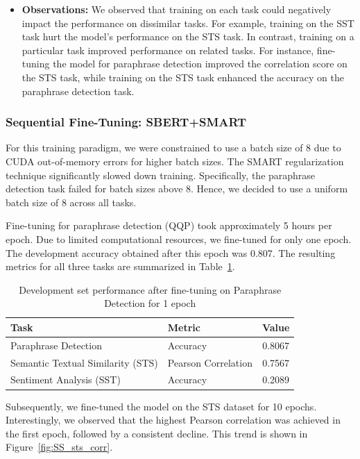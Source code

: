 \begin{itemize}
    \item \textbf{Observations:}
    We observed that training on each task could negatively impact the performance on dissimilar tasks. For example, training on the SST task hurt the model's performance on the STS task. In contrast, training on a particular task improved performance on related tasks. For instance, fine-tuning the model for paraphrase detection improved the correlation score on the STS task, while training on the STS task enhanced the accuracy on the paraphrase detection task.
\end{itemize}

\subsubsection{Sequential Fine-Tuning: SBERT+SMART}
For this training paradigm, we were constrained to use a batch size of 8 due to CUDA out-of-memory errors for higher batch sizes. The SMART regularization technique significantly slowed down training. Specifically, the paraphrase detection task failed for batch sizes above 8. Hence, we decided to use a uniform batch size of 8 across all tasks.

Fine-tuning for paraphrase detection (QQP) took approximately 5 hours per epoch. Due to limited computational resources, we fine-tuned for only one epoch. The development accuracy obtained after this epoch was 0.807. The resulting metrics for all three tasks are summarized in Table~\ref{tab:post_finetuning_metrics_SS}.

\begin{table}[H]
    \centering
    \begin{tabular}{|l|l|c|}
    \hline
    \textbf{Task} & \textbf{Metric} & \textbf{Value} \\ \hline
    Paraphrase Detection & Accuracy & 0.8067 \\ \hline
    Semantic Textual Similarity (STS) & Pearson Correlation & 0.7567 \\ \hline
    Sentiment Analysis (SST) & Accuracy & 0.2089 \\ \hline
    \end{tabular}
    \caption{Development set performance after fine-tuning on Paraphrase Detection for 1 epoch}
    \label{tab:post_finetuning_metrics_SS}
\end{table}

Subsequently, we fine-tuned the model on the STS dataset for 10 epochs. Interestingly, we observed that the highest Pearson correlation was achieved in the first epoch, followed by a consistent decline. This trend is shown in Figure~\ref{fig:SS_sts_corr}.

